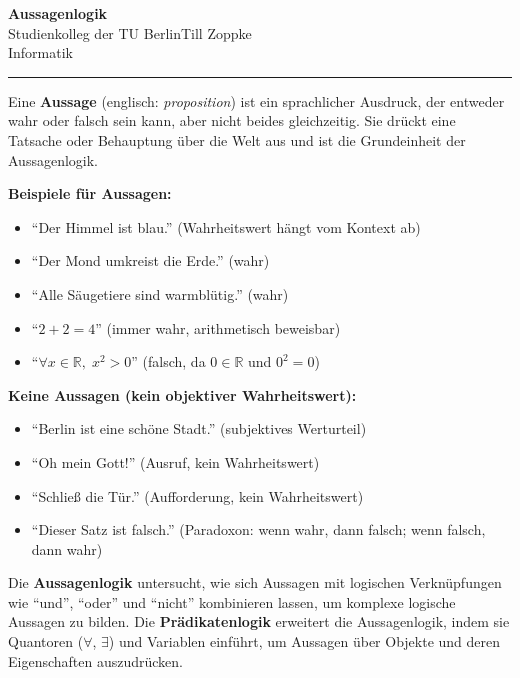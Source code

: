\documentclass[ngerman,11pt]{article}
\date{\DTMgermanmonthname{\month} \the\year}
\begin{document}
\begin{center}
{\large\bf Aussagenlogik}\\[-2mm]
Studienkolleg der TU Berlin\hfill Till Zoppke\\
\makeatletter Informatik \hfill \@date\\[2mm] \makeatother
\end{center}
\hrule
\par\bigskip

\noindent
Eine {\bfseries Aussage} (englisch: \emph{proposition}) ist ein sprachlicher Ausdruck, der entweder wahr oder falsch sein kann, aber nicht beides gleichzeitig. Sie drückt eine Tatsache oder Behauptung über die Welt aus und ist die Grundeinheit der Aussagenlogik.

\medskip
\noindent
{\bfseries Beispiele für Aussagen:}
\begin{itemize}
    \item ``Der Himmel ist blau.'' (Wahrheitswert hängt vom Kontext ab)
    \item ``Der Mond umkreist die Erde.'' (wahr)
    \item ``Alle Säugetiere sind warmblütig.'' (wahr)
    \item ``$2 + 2 = 4$'' (immer wahr, arithmetisch beweisbar)
    \item ``$\forall x \in \mathbb{R},\; x^2 > 0$'' (falsch, da $0 \in \mathbb{R}$ und $0^2 = 0$)
\end{itemize}

\medskip
\noindent
{\bfseries Keine Aussagen (kein objektiver Wahrheitswert):}
\begin{itemize}
    \item ``Berlin ist eine schöne Stadt.'' (subjektives Werturteil)
    \item ``Oh mein Gott!'' (Ausruf, kein Wahrheitswert)
    \item ``Schließ die Tür.'' (Aufforderung, kein Wahrheitswert)
    \item ``Dieser Satz ist falsch.'' (Paradoxon: wenn wahr, dann falsch; wenn falsch, dann wahr)
\end{itemize}

\medskip
\noindent
Die {\bfseries Aussagenlogik} untersucht, wie sich Aussagen mit logischen Verknüpfungen wie ``und'', ``oder'' und ``nicht'' kombinieren lassen, um komplexe logische Aussagen zu bilden. Die {\bfseries Prädikatenlogik} erweitert die Aussagenlogik, indem sie Quantoren ($\forall$, $\exists$) und Variablen einführt, um Aussagen über Objekte und deren Eigenschaften auszudrücken.
\end{document}
